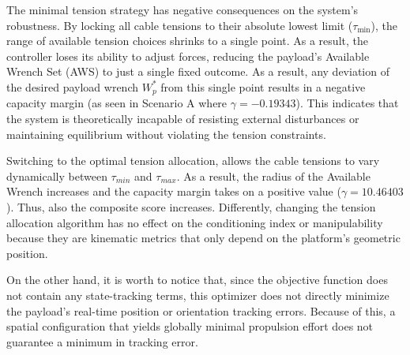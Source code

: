 The minimal tension strategy has negative consequences on the system's robustness. By locking all cable tensions to their absolute lowest limit ($\tau_{\min}$), the range of available tension choices shrinks to a single point. As a result, the controller loses its ability to adjust forces, reducing the payload's Available Wrench Set (AWS) to just a single fixed outcome. \cite{yang_robust_2025}
As a result, any deviation of the desired payload wrench $W_p^*$ from this single point results in a negative capacity margin (as seen in Scenario A where $\gamma = -0.19343$). This indicates that the system is theoretically incapable of resisting external disturbances or maintaining equilibrium without violating the tension constraints.

Switching to the optimal tension allocation, allows the cable tensions to vary dynamically between $\tau_{min}$ and $\tau_{max}$. As a result, the radius of the Available Wrench increases and the capacity margin takes on a positive value ($\gamma = 10.46403$). Thus, also the composite score increases. Differently, changing the tension allocation algorithm has no effect on the conditioning index or manipulability because they are kinematic metrics that only depend on the platform's geometric position.


On the other hand, it is worth to notice that, since the objective function does not contain any state-tracking terms, this optimizer does not directly minimize the payload's real-time position or orientation tracking errors. 
Because of this, a spatial configuration that yields globally minimal propulsion effort does not guarantee a minimum in tracking error.


